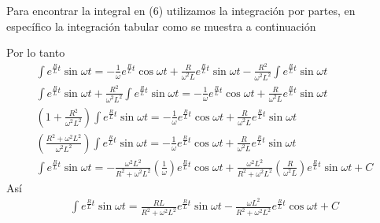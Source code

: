 \documentclass{article}
\begin{document}
Para encontrar la integral en (6) utilizamos la integración por partes, en específico la integración tabular como se muestra a continuación\\


Por lo tanto
\begin{align}
	\int e^{\frac{R}{L}t}\sin \omega t = -\frac{1}{\omega} e^{\frac{R}{L}t}\cos \omega t + \frac{R}{\omega ^{2} L} e^{\frac{R}{L}t} \sin \omega t - \frac{R^2}{\omega^{2} L^{2}}\int e^{\frac{R}{L}t} \sin \omega t \nonumber\\
		\int e^{\frac{R}{L}t}\sin \omega t + \frac{R^2}{\omega^{2} L^{2}}\int e^{\frac{R}{L}t} \sin \omega t = -\frac{1}{\omega} e^{\frac{R}{L}t}\cos \omega t + \frac{R}{\omega ^{2} L} e^{\frac{R}{L}t} \sin \omega t\nonumber\\
	\left( 1 + \frac{R^2}{\omega^{2}L^2} \right) \int e^{\frac{R}{L}t}\sin \omega t =  -\frac{1}{\omega} e^{\frac{R}{L}t}\cos \omega t + \frac{R}{\omega ^{2} L} e^{\frac{R}{L}t} \sin \omega t\nonumber\\
	\left(\frac{R^2 + \omega^{2}L^2}{\omega^{2}L^2} \right) \int e^{\frac{R}{L}t}\sin \omega t =  -\frac{1}{\omega} e^{\frac{R}{L}t}\cos \omega t + \frac{R}{\omega ^{2} L} e^{\frac{R}{L}t} \sin \omega t\nonumber\\
	\int e^{\frac{R}{L}t}\sin \omega t = -\frac{\omega^{2}L^2}{R^2 + \omega^{2}L^2}\left( \frac{1}{\omega}\right) e^{\frac{R}{L}t}\cos \omega t +  \frac{\omega^{2}L^2}{R^2 + \omega^{2}L^2}\left( \frac{R}{\omega^{2}L} \right)e^{\frac{R}{L}t}\sin \omega t\nonumber + C
\end{align}
Así
\begin{align}
	\int e^{\frac{R}{L}t}\sin \omega t = \frac{RL}{R^2 + \omega^{2}L^2}e^{\frac{R}{L}t}\sin \omega t -\frac{\omega L^2}{R^2 + \omega^{2}L^2}e^{\frac{R}{L}t} \cos \omega t + C
\end{align}
\end{document}
